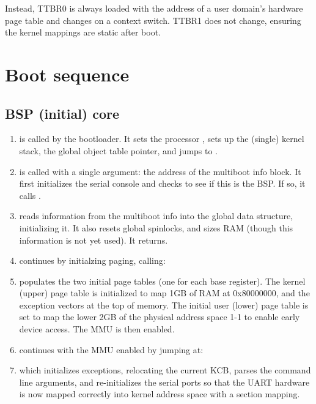 \documentclass[a4paper,twoside]{report} %
\begin{document}
Instead, TTBR0 is always loaded with the address of a user domain's
hardware page table and changes on a context switch.  TTBR1 does not
change, ensuring the kernel mappings are static after boot.

\chapter{Boot sequence}

\section{BSP (initial) core}

\begin{enumerate}
\item {} is called by the bootloader.  It
  sets the processor , sets up the (single) kernel
  stack, the global object table pointer, and jumps to
  .
\item {} is called with a single
  argument: the address of the multiboot info block.  It first
  initializes the serial console  and
  checks to see if this is the BSP.  If so, it calls
  . 
\item {} reads information from the multiboot
  info into the global data structure, initializing it.  It also
  resets global spinlocks, and sizes RAM (though this information is
  not yet used).  It returns.
\item {} continues by initialzing paging,
  calling:
\item {} populates the two initial page
  tables (one for each base register).  The kernel (upper) page table
  is initialized to map 1GB of RAM at 0x80000000, and the exception
  vectors at the top of memory.  The initial user (lower) page table
  is set to map the lower 2GB of the physical address space 1-1 to
  enable early device access.  The MMU is then enabled.
\item {} continues with the MMU enabled by
  jumping at: 
\item {} which initializes exceptions,
  relocating the current KCB, parses the command line arguments, and
  re-initializes the serial ports so that the UART hardware is now
  mapped correctly into kernel address space with a section mapping. 


\end{enumerate}
\end{document}
